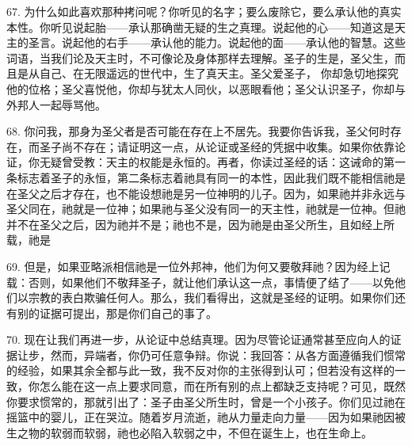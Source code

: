 67. 为什么如此喜欢那种拷问呢？你听见的名字；要么废除它，要么承认他的真实本性。你听见说起胎——承认那确凿无疑的生之真理。说起他的心——知道这是天主的圣言。说起他的右手——承认他的能力。说起他的面——承认他的智慧。这些词语，当我们论及天主时，不可像论及身体那样去理解。圣子的生是，圣父生，而且是从自己、在无限遥远的世代中，生了真天主。圣父爱圣子， 你却急切地探究他的位格；圣父喜悦他，你却与犹太人同伙，以恶眼看他；圣父认识圣子，你却与外邦人一起辱骂他。\par

\par

68. 你问我，那身为圣父者是否可能在存在上不居先。我要你告诉我，圣父何时存在，而圣子尚不存在；请证明这一点，从论证或圣经的凭据中收集。如果你依靠论证，你无疑曾受教：天主的权能是永恒的。再者，你读过圣经的话：这诫命的第一条标志着圣子的永恒，第二条标志着祂具有同一的本性，因此我们既不能相信祂是在圣父之后才存在，也不能设想祂是另一位神明的儿子。因为，如果祂并非永远与圣父同在，祂就是一位神；如果祂与圣父没有同一的天主性，祂就是一位神。但祂并不在圣父之后，因为祂并不是；祂也不是，因为祂是由圣父所生，且如经上所载，祂是\par

69. 但是，如果亚略派相信祂是一位外邦神，他们为何又要敬拜祂？因为经上记载：否则，如果他们不敬拜圣子，就让他们承认这一点，事情便了结了——以免他们以宗教的表白欺骗任何人。那么，我们看得出，这就是圣经的证明。如果你们还有别的证据可提出，那是你们自己的事了。\par

70. 现在让我们再进一步，从论证中总结真理。因为尽管论证通常甚至应向人的证据让步，然而，异端者，你仍可任意争辩。你说：我回答：从各方面遵循我们惯常的经验，如果其余全都与此一致，我不反对你的主张得到认可；但若没有这样的一致，你怎么能在这一点上要求同意，而在所有别的点上都缺乏支持呢？可见，既然你要求惯常的，那就引出了：圣子由圣父所生时，曾是一个小孩子。你们见过祂在摇篮中的婴儿，正在哭泣。随着岁月流逝，祂从力量走向力量——因为如果祂因被生之物的软弱而软弱，祂也必陷入软弱之中，不但在诞生上，也在生命上。\par

